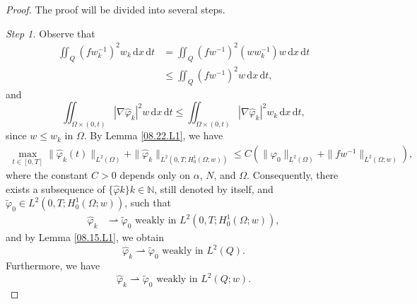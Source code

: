 \documentclass[10pt,a4paper]{amsart}
\begin{document}
\begin{proof}  The proof will be divided into several steps.

{\it Step 1.}  Observe that
\begin{equation}\label{12.11.1}
\begin{split}
\iint_Q (fw_k^{-1})^2w_k\,\mathrm{d} x\,\mathrm{d} t &= \iint_{Q}(fw^{-1})^2(ww_k^{-1})w\,\mathrm{d} x\,\mathrm{d} t \\
&\leq \iint_Q (fw^{-1})^2w\,\mathrm{d} x\,\mathrm{d} t,
\end{split}
\end{equation}
and
\begin{equation*}
\iint_{\Omega\times (0,t)}|\nabla\widehat{\varphi}_k|^2w\,\mathrm{d} x\,\mathrm{d} t \leq \iint_{\Omega\times (0,t)}|\nabla \widehat{\varphi}_k|^2w_k\,\mathrm{d} x\,\mathrm{d} t,
\end{equation*}
since $w\leq w_k$ in $\Omega$. By Lemma \ref{08.22.L1}, we have
\begin{equation*}
\begin{split}
\max_{t\in [0,T]}\|\widehat{\varphi}_k(t)\|_{L^2(\Omega)}+\|\widehat{\varphi}_k\|_{L^2(0,T; H_0^1(\Omega;w))} \leq C\left(\|\varphi_0\|_{L^2(\Omega)}+\|fw^{-1}\|_{L^2(\Omega; w)}\right),
\end{split}
\end{equation*}
where the constant $C>0$ depends only on $\alpha$, $N$, and $\Omega$. Consequently, there exists a subsequence of $\{\widehat{\varphi}k\}{k\in\mathbb{N}}$, still denoted by itself, and $\widetilde{\varphi}_0\in L^2(0,T; H_0^1(\Omega;w))$, such that
\begin{equation}\label{08.16.4}
\begin{split}
\widehat{\varphi}_k
&\rightharpoonup \widetilde{\varphi}_0   \text{  weakly in } L^2(0,T; H_0^1(\Omega;w)),
\end{split}
\end{equation}
and by Lemma \ref{08.15.L1}, we obtain
\begin{equation}\label{08.23.1}
\widehat{\varphi}_k
\rightharpoonup \widetilde{\varphi}_0   \text{  weakly in } L^2(Q).
\end{equation}
Furthermore, we have
\begin{equation*}
\widehat{\varphi}_k
\rightharpoonup \widetilde{\varphi}_0   \text{  weakly in } L^2(Q; w).
\end{equation*}


\end{proof}
\end{document}
